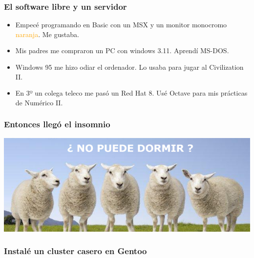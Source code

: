 \documentclass[12pt]{beamer}
\begin{document}
\begin{frame}
\frametitle{El software libre y un servidor}
\begin{itemize}
\item Empecé programando en Basic con un MSX y un monitor monocromo
  \textcolor{orange}{naranja}. Me gustaba.
\pause
\item Mis padres me compraron un PC con windows 3.11. Aprendí
  MS-DOS.
\pause
\item Windows 95 me hizo odiar el ordenador. Lo usaba para jugar al
  Civilization II.
\pause
\item En 3º un colega teleco me pasó un Red Hat 8.  Usé Octave para
  mis prácticas de Numérico II.
\end{itemize}
\end{frame}


\begin{frame}
\frametitle{Entonces llegó el insomnio}
 \includegraphics[width=\textwidth]{files/insomnio-ovejas.png}
\end{frame}

\begin{frame}
  \frametitle{Instalé un cluster casero en Gentoo}
\end{frame}
\end{document}
